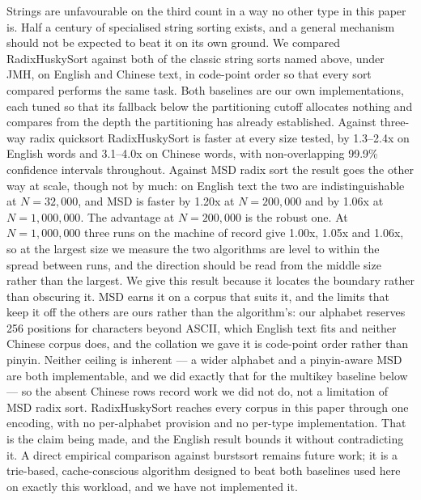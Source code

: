 \documentclass[twoside,leqno,twocolumn]{article}
\begin{document}
Strings are unfavourable on the third count in a way no other type in this paper is.
Half a century of specialised string sorting exists,
and a general mechanism should not be expected to beat it on its own ground.
We compared RadixHuskySort against both of the classic string sorts named above,
under JMH, on English and Chinese text, in code-point order so that every sort compared
performs the same task.
Both baselines are our own implementations,
each tuned so that its fallback below the partitioning cutoff allocates nothing
and compares from the depth the partitioning has already established.
Against three-way radix quicksort RadixHuskySort is faster at every size tested,
by 1.3--2.4x on English words and 3.1--4.0x on Chinese words,
with non-overlapping 99.9\% confidence intervals throughout.
Against MSD radix sort the result goes the other way at scale, though not by much:
on English text the two are indistinguishable at $N=32{,}000$,
and MSD is faster by 1.20x at $N=200{,}000$ and by 1.06x at $N=1{,}000{,}000$.
The advantage at $N=200{,}000$ is the robust one.
At $N=1{,}000{,}000$ three runs on the machine of record give 1.00x, 1.05x and 1.06x,
so at the largest size we measure the two algorithms are level to within the spread between runs,
and the direction should be read from the middle size rather than the largest.
We give this result because it locates the boundary rather than obscuring it.
MSD earns it on a corpus that suits it, and the limits that keep it off the others are ours rather
than the algorithm's: our alphabet reserves 256 positions for characters beyond ASCII, which English
text fits and neither Chinese corpus does, and the collation we gave it is code-point order rather
than pinyin.
Neither ceiling is inherent --- a wider alphabet and a pinyin-aware MSD are both implementable, and we
did exactly that for the multikey baseline below --- so the absent Chinese rows record work we did not
do, not a limitation of MSD radix sort.
RadixHuskySort reaches every corpus in this paper through one encoding,
with no per-alphabet provision and no per-type implementation.
That is the claim being made, and the English result bounds it without contradicting it.
A direct empirical comparison against burstsort remains future work;
it is a trie-based, cache-conscious algorithm designed to beat both baselines used here on exactly this workload,
and we have not implemented it.
\end{document}
